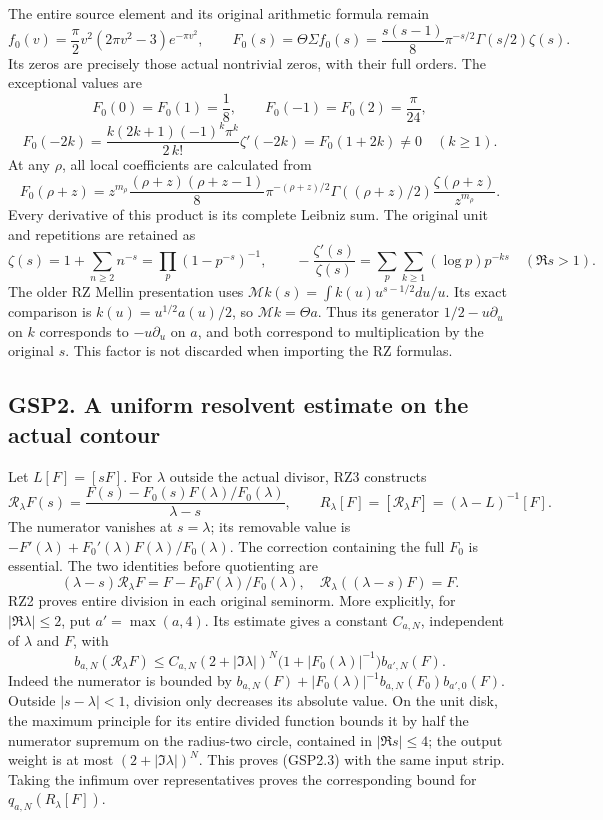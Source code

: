 The entire source element and its original arithmetic formula remain \[
f_0(v)=\frac\pi2v^2(2\pi v^2-3)e^{-\pi v^2},\qquad
F_0(s)=\Theta\Sigma f_0(s)
=\frac{s(s-1)}8\pi^{-s/2}\Gamma(s/2)\zeta(s).
\tag{GSP1.5}
\] Its zeros are precisely those actual nontrivial zeros, with their
full orders. The exceptional values are \[
F_0(0)=F_0(1)=\frac18,\qquad F_0(-1)=F_0(2)=\frac\pi{24},
\] \[
F_0(-2k)=\frac{k(2k+1)(-1)^k\pi^k}{2\,k!}\zeta'(-2k)
=F_0(1+2k)\ne0\quad(k\ge1).
\tag{GSP1.6}
\] At any \(\rho\), all local coefficients are calculated from \[
F_0(\rho+z)=z^{m_\rho}
\frac{(\rho+z)(\rho+z-1)}8\pi^{-(\rho+z)/2}
\Gamma((\rho+z)/2)\frac{\zeta(\rho+z)}{z^{m_\rho}}.
\tag{GSP1.7}
\] Every derivative of this product is its complete Leibniz sum. The
original unit and repetitions are retained as \[
\zeta(s)=1+\sum_{n\ge2}n^{-s}=\prod_p(1-p^{-s})^{-1},\qquad
-\frac{\zeta'(s)}{\zeta(s)}=\sum_p\sum_{k\ge1}(\log p)p^{-ks}
\quad(\Re s>1).
\tag{GSP1.8}
\] The older RZ Mellin presentation uses
\(\mathcal Mk(s)=\int k(u)u^{s-1/2}du/u\). Its exact comparison is
\(k(u)=u^{1/2}a(u)/2\), so \(\mathcal Mk=\Theta a\). Thus its generator
\(1/2-u\partial_u\) on \(k\) corresponds to \(-u\partial_u\) on \(a\),
and both correspond to multiplication by the original \(s\). This factor
is not discarded when importing the RZ formulas.

\subsection{GSP2. A uniform resolvent estimate on the actual
contour}\label{gsp2.-a-uniform-resolvent-estimate-on-the-actual-contour}

Let \(L[F]=[sF]\). For \(\lambda\) outside the actual divisor, RZ3
constructs \[
\mathscr R_\lambda F(s)
=\frac{F(s)-F_0(s)F(\lambda)/F_0(\lambda)}{\lambda-s},\qquad
R_\lambda[F]=[\mathscr R_\lambda F]=(\lambda-L)^{-1}[F].
\tag{GSP2.1}
\] The numerator vanishes at \(s=\lambda\); its removable value is
\(-F'(\lambda)+F_0'(\lambda)F(\lambda)/F_0(\lambda)\). The correction
containing the full \(F_0\) is essential. The two identities before
quotienting are \[
(\lambda-s)\mathscr R_\lambda F=F-F_0F(\lambda)/F_0(\lambda),
\quad \mathscr R_\lambda((\lambda-s)F)=F.
\tag{GSP2.2}
\] RZ2 proves entire division in each original seminorm. More
explicitly, for \(|\Re\lambda|\le2\), put \(a'=\max(a,4)\). Its estimate
gives a constant \(C_{a,N}\), independent of \(\lambda\) and \(F\), with
\[
b_{a,N}(\mathscr R_\lambda F)
\le C_{a,N}(2+|\Im\lambda|)^N
\bigl(1+|F_0(\lambda)|^{-1}\bigr)b_{a',N}(F).
\tag{GSP2.3}
\] Indeed the numerator is bounded by
\(b_{a,N}(F)+|F_0(\lambda)|^{-1}b_{a,N}(F_0)b_{a',0}(F)\). Outside
\(|s-\lambda|<1\), division only decreases its absolute value. On the
unit disk, the maximum principle for its entire divided function bounds
it by half the numerator supremum on the radius-two circle, contained in
\(|\Re s|\le4\); the output weight is at most \((2+|\Im\lambda|)^N\).
This proves (GSP2.3) with the same input strip. Taking the infimum over
representatives proves the corresponding bound for
\(q_{a,N}(R_\lambda[F])\).

